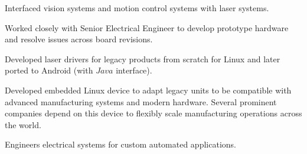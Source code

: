 \begin{cventries}
{\begin{cvitems}
        \item {
            Interfaced vision systems and motion control systems with laser systems.
        }
        \item {
            Worked closely with Senior Electrical Engineer to develop prototype hardware
            and resolve issues across board revisions.
        }
        \item {
            Developed laser drivers for legacy products from scratch for Linux and later
            ported to Android (with $Java$ interface).
        }
        \item {
            Developed embedded Linux device to adapt legacy units to be compatible with
            advanced manufacturing systems and modern hardware. Several prominent
            companies depend on this device to flexibly scale manufacturing operations
            across the world.
        }
        \item {
            Engineers electrical systems for custom automated applications.
        }
      \end{cvitems}
    }

\end{cventries}
